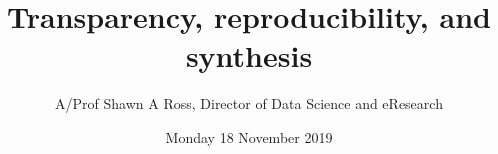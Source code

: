 \documentclass[aspectratio=169, 11pt]{beamer} %
\title{Transparency, reproducibility, and synthesis} %
\author{A/Prof Shawn A Ross, Director of Data Science and eResearch}               %
\institute{Office of the Deputy Vice-Chancellor (Research)}         %
\date{Monday 18 November 2019}                 %
\begin{document}

\end{document}
